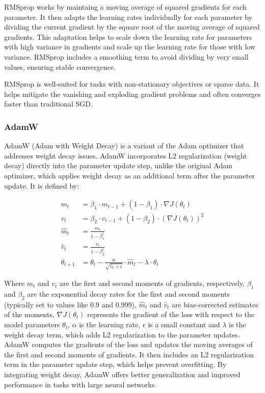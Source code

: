 RMSprop works by maintaing a moving average of squared gradients for each parameter. It then adapts the learning rates individually for each parameter by dividing the current gradient by the square root of the moving average of squared gradients.
This adaptation helps to scale down the learning rate for parameters with high variance in gradients and scale up the learning rate for those with low variance.
RMSprop includes a smoothing term to avoid dividing by very small values, ensuring stable convergence.

RMSprop is well-suited for tasks with non-stationary objectives or sparse data. It helps mitigate the vanishing and exploding gradient problems and often converges faster than traditional SGD.

\subsubsection{AdamW}

AdamW (Adam with Weight Decay) is a variant of the Adam optimizer that addresses weight decay issues. AdamW incorporates L2 regularization (weight decay) directly into the parameter update step, unlike the original Adam optimizer, which applies weight decay as an additional term after the parameter update. It is defined by:

\begin{align}
	m_t &= \beta_1 \cdot m_{t-1} + (1 - \beta_1) \cdot \nabla J(\theta_t) \\
	v_t &= \beta_2 \cdot v_{t-1} + (1 - \beta_2) \cdot (\nabla J(\theta_t))^2 \\
	\hat{m}_t &= \frac{m_t}{1 - \beta_1^t} \\
	\hat{v}_t &= \frac{v_t}{1 - \beta_2^t} \\
	\theta_{t+1} &= \theta_t - \frac{\alpha}{\sqrt{\hat{v}_t + \epsilon}} \cdot \hat{m}_t - \lambda \cdot \theta_t
\end{align}

Where \(m_t\) and \(v_t\) are the first and second moments of gradients, respectively, \(\beta_1\) and \(\beta_2\) are the exponential decay rates for the first and second moments (typically set to values like 0.9 and 0.999), \(\hat{m}_t\) and \(\hat{v}_t\) are bias-corrected estimates of the moments, \(\nabla J(\theta_t)\) represents the gradient of the loss with respect to the model parameters \(\theta_t\), \(\alpha\) is the learning rate, \(\epsilon\) is a small constant and \(\lambda\) is the weight decay term, which adds L2 regularization to the parameter updates. \\
AdamW computes the gradients of the loss and updates the moving averages of the first and second moments of gradients.
It then includes an L2 regularization term in the parameter update step, which helps prevent overfitting.
By integrating weight decay, AdamW offers better generalization and improved performance in tasks with large neural networks.\\

